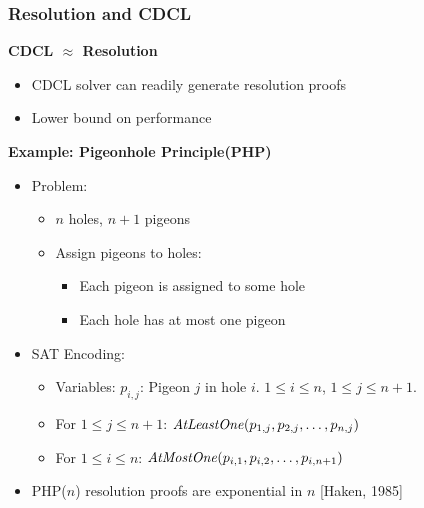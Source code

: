 \documentclass[t,pdf]{beamer}
\begin{document}
\begin{frame}
  \frametitle{Resolution and CDCL}
  
{\bf CDCL $\approx$ Resolution}
\begin{itemize}
\item {}CDCL solver can readily generate resolution  proofs 
\item {}Lower bound on performance
\end{itemize}
{\bf Example: Pigeonhole Principle(PHP)}
\begin{itemize}
\item Problem:
  \begin{itemize}
    \item $n$ holes, $n+1$ pigeons
    \item Assign pigeons to holes:
      \begin{itemize}
      \item Each pigeon is assigned to some hole
      \item Each hole has at most one pigeon
      \end{itemize}
  \end{itemize}
\item SAT Encoding:
  \begin{itemize}
    \item Variables: $p_{i,j}$: Pigeon $j$ in hole $i$.  $1 \leq i \leq n$, $1 \leq j \leq n+1$. 
    \item For $1 \leq j \leq n+1$: ${\it AtLeastOne}(p_{1,j}, p_{2,j}, \ldots, p_{n,j})$
    \item For $1 \leq i \leq n$: ${\it AtMostOne}(p_{i,1}, p_{i,2}, \ldots, p_{i,n+1})$
  \end{itemize}
\item PHP($n$) resolution proofs are exponential in $n$ [Haken, 1985]
\end{itemize}

\end{frame}
\end{document}
